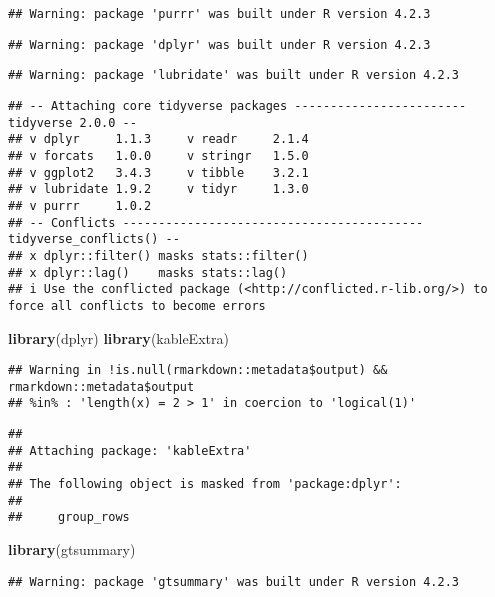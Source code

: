 \documentclass[
]{article}
\newenvironment{Shaded}{\begin{snugshade}}{\end{snugshade}}
\newcommand{\FunctionTok}[1]{\textcolor[rgb]{0.13,0.29,0.53}{\textbf{#1}}}
\newcommand{\NormalTok}[1]{#1}
\begin{document}
\begin{verbatim}
## Warning: package 'purrr' was built under R version 4.2.3
\end{verbatim}

\begin{verbatim}
## Warning: package 'dplyr' was built under R version 4.2.3
\end{verbatim}

\begin{verbatim}
## Warning: package 'lubridate' was built under R version 4.2.3
\end{verbatim}

\begin{verbatim}
## -- Attaching core tidyverse packages ------------------------ tidyverse 2.0.0 --
## v dplyr     1.1.3     v readr     2.1.4
## v forcats   1.0.0     v stringr   1.5.0
## v ggplot2   3.4.3     v tibble    3.2.1
## v lubridate 1.9.2     v tidyr     1.3.0
## v purrr     1.0.2     
## -- Conflicts ------------------------------------------ tidyverse_conflicts() --
## x dplyr::filter() masks stats::filter()
## x dplyr::lag()    masks stats::lag()
## i Use the conflicted package (<http://conflicted.r-lib.org/>) to force all conflicts to become errors
\end{verbatim}

\begin{Shaded}
\begin{Highlighting}[]
\FunctionTok{library}\NormalTok{(dplyr)}
\FunctionTok{library}\NormalTok{(kableExtra)}
\end{Highlighting}
\end{Shaded}

\begin{verbatim}
## Warning in !is.null(rmarkdown::metadata$output) && rmarkdown::metadata$output
## %in% : 'length(x) = 2 > 1' in coercion to 'logical(1)'
\end{verbatim}

\begin{verbatim}
## 
## Attaching package: 'kableExtra'
## 
## The following object is masked from 'package:dplyr':
## 
##     group_rows
\end{verbatim}

\begin{Shaded}
\begin{Highlighting}[]
\FunctionTok{library}\NormalTok{(gtsummary)}
\end{Highlighting}
\end{Shaded}

\begin{verbatim}
## Warning: package 'gtsummary' was built under R version 4.2.3
\end{verbatim}
\end{document}
